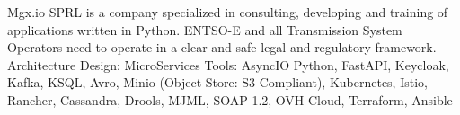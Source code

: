 \documentclass[
  a4paper,
]{fortysecondscv}
\begin{document}
\makefrontsidebar

\begin{cvtable}
    {Mgx.io SPRL is a company specialized in consulting, developing and training
     of applications written in Python.  }
    {ENTSO-E and all Transmission System Operators need to operate in a clear and safe legal and regulatory framework. 
     Architecture Design: MicroServices
     Tools: AsyncIO Python, FastAPI, Keycloak, Kafka, KSQL, Avro, Minio (Object
     Store: S3 Compliant), Kubernetes, Istio, Rancher, Cassandra, Drools, MJML,
     SOAP 1.2, OVH Cloud, Terraform, Ansible
    }
\end{cvtable}
\end{document}
